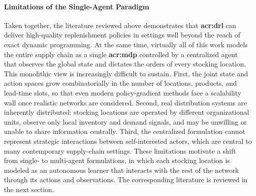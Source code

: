 \paragraph{\textbf{Limitations of the Single-Agent Paradigm}}
Taken together, the literature reviewed above demonstrates that \textbf{{acr:drl}} can deliver high-quality replenishment policies in settings well beyond the reach of exact dynamic programming. At the same time, virtually all of this work models the entire supply chain as a single \textbf{{acr:mdp}} controlled by a centralized agent that observes the global state and dictates the orders of every stocking location. This monolithic view is increasingly difficult to sustain. First, the joint state and action spaces grow combinatorially in the number of locations, products, and lead-time slots, so that even modern policy-gradient methods face a scalability wall once realistic networks are considered. Second, real distribution systems are inherently distributed: stocking locations are operated by different organizational units, observe only local inventory and demand signals, and may be unwilling or unable to share information centrally. Third, the centralized formulation cannot represent strategic interactions between self-interested actors, which are central to many contemporary supply-chain settings. These limitations motivate a shift from single- to multi-agent formulations, in which each stocking location is modeled as an autonomous learner that interacts with the rest of the network through its actions and observations. The corresponding literature is reviewed in the next section.